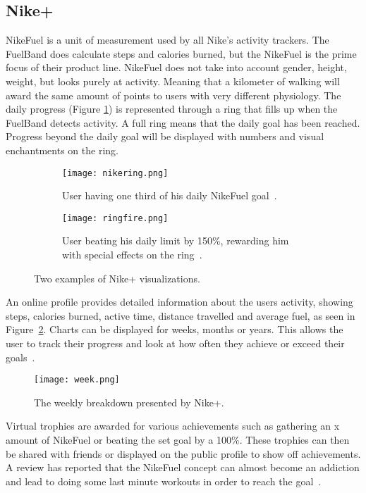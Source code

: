 \subsection{Nike+}
NikeFuel \cite{nikefuel} is a unit of measurement used by all Nike's activity trackers. The FuelBand does calculate steps and calories burned, but the NikeFuel is the prime focus of their product line. NikeFuel does not take into account gender, height, weight, but looks purely at activity. Meaning that a kilometer of walking will award the same amount of points to users with very different physiology. The daily progress (Figure \ref{fig:tworings}) is represented through a ring that fills up when the FuelBand detects activity. A full ring means that the daily goal has been reached. Progress beyond the daily goal will be displayed with numbers and visual enchantments on the ring. 


\begin{figure}[h!]
 \centering
  \begin{subfigure}[t]{0.49\textwidth}
    \centering
    \texttt{[image: nikering.png]}
    \caption{User having one third of his daily NikeFuel goal~\cite{fuelbandDcRain}.}
  \end{subfigure}
  \begin{subfigure}[t]{0.49\textwidth}
    \centering
    \texttt{[image: ringfire.png]}
    \caption{User beating his daily limit by 150\%, rewarding him with special effects on the ring~\cite{fuelbandTechSpce}.}
  \end{subfigure} 
  \caption[Nike+ visualisations]{Two examples of Nike+ visualizations.}
  \label{fig:tworings}
\end{figure}

An online profile provides detailed information about the users activity, showing steps, calories burned, active time, distance travelled and average fuel, as seen in Figure~\ref{fig:activityBreakdown}. Charts can be displayed for weeks, months or years. This allows the user to track their progress and look at how often they achieve or exceed their goals~\cite{fuelbandTechSpce}. 

\begin{figure}[h!]
	\centering
		\texttt{[image: week.png]}
		\caption[Weekly breakdown (Nike)]{The weekly breakdown presented by Nike+. \cite{fuelbandTechSpce}}
		\label{fig:activityBreakdown}
\end{figure}

Virtual trophies are awarded for various achievements such as gathering an x amount of NikeFuel or beating the set goal by a 100\%. These trophies can then be shared with friends or displayed on the public profile to show off achievements. A review has reported that the NikeFuel concept can almost become an addiction and lead to doing some last minute workouts in order to reach the goal~\cite{fuelbandDcRain}.

